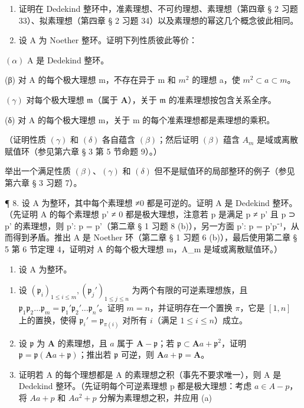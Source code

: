 \begin{enumerate}
\def\labelenumi{\arabic{enumi}.}
\setcounter{enumi}{5}
\item
  证明在 Dedekind 整环中，准素理想、不可约理想、素理想（第四章 § 2 习题 33）、拟素理想（第四章 § 2 习题 34）以及素理想的幂这几个概念彼此相同。
\item
  设 A 为 Noether 整环。证明下列性质彼此等价：
\end{enumerate}

\((\alpha)\) A 是 Dedekind 整环。

(β) 对 A 的每个极大理想 m，不存在异于 m 和 \(m^{2}\) 的理想 a，使 \(m^{2} \subset a \subset m\)。

\((\gamma)\) 对每个极大理想 \(\mathfrak{m}\)（属于 \(\mathbf{A}\)），关于 \(\mathfrak{m}\) 的准素理想按包含关系全序。

(δ) 对 A 的每个极大理想 m，关于 m 的每个准素理想都是素理想的乘积。

（证明性质 \((\gamma)\) 和 \((\delta)\) 各自蕴含 \((\beta)\)；然后证明 \((\beta)\) 蕴含 \(A_{m}\) 是域或离散赋值环（参见第六章 § 3 第 5 节命题 9）。）

举出一个满足性质 \((\beta)\)、\((\gamma)\) 和 \((\delta)\) 但不是赋值环的局部整环的例子（参见第六章 § 3 习题 7）。

¶ 8. 设 A 为整环，其中每个素理想 ≠0 都是可逆的。证明 A 是 Dedekind 整环。（先证明 A 的每个素理想 p' ≠ 0 都是极大理想，注意若 p 是满足 p ≠ p' 且 p ⊃ p' 的素理想，则 p': p = p'（第二章 § 1 习题 8 (b)），另一方面 p': p = p'p⁻¹，从而得到矛盾。推出 A 是 Noether 环（第二章 § 1 习题 6 (b)），最后使用第二章 § 5 第 6 节定理 4，证明对 A 的每个极大理想 m，A\_m 是域或离散赋值环。）

\begin{enumerate}
\def\labelenumi{\arabic{enumi}.}
\setcounter{enumi}{8}
\tightlist
\item
  设 A 为整环。
\end{enumerate}

\begin{enumerate}
\def\labelenumi{(\alph{enumi})}
\item
  设 \((\mathfrak{p}_i)_{1\leqslant i\leqslant m},(\mathfrak{p}_j')_{1\leqslant j\leqslant n}\) 为两个有限的可逆素理想族，且 \(\mathfrak{p}_1\mathfrak{p}_2\dots \mathfrak{p}_m = \mathfrak{p}_1'\mathfrak{p}_2'\dots \mathfrak{p}_n'\)。证明 \(m = n\)，并证明存在一个置换 \(\pi\)，它是 \([1,n]\) 上的置换，使得 \(\mathfrak{p}_i' = \mathfrak{p}_{\pi (i)}\) 对所有 \(i\)（满足 \(1\leqslant i\leqslant n\)）成立。
\item
  设 \(\mathfrak{p}\) 为 \(\mathbf{A}\) 的素理想，且 \(a\) 属于 \(\mathbf{A} - \mathfrak{p}\)；若 \(\mathfrak{p} \subset \mathbf{A}a + \mathfrak{p}^2\)，证明 \(\mathfrak{p} = \mathfrak{p}(\mathbf{A}a + \mathfrak{p})\)；推出若 \(\mathfrak{p}\) 可逆，则 \(\mathbf{A}a + \mathfrak{p} = \mathbf{A}\)。
\item
  证明若 A 的每个理想都是 A 的素理想之积（事先不要求唯一），则 A 是 Dedekind 整环。（先证明每个可逆素理想 p 都是极大理想：考虑 \(a \in A - p\)，将 \(Aa + p\) 和 \(Aa^{2} + p\) 分解为素理想之积，并应用 (a)
\end{enumerate}

